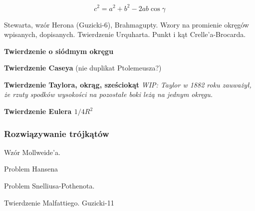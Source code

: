 $$c^2 = a^2 + b^2 - 2ab \cos \gamma$$


Stewarta, wzór Herona (Guzicki-6), Brahmagupty.
Wzory na promienie okręgów wpisanych, dopisanych.
Twierdzenie Urquharta.
Punkt i kąt Crelle'a-Brocarda.

\textbf{Twierdzenie o siódmym okręgu}

\textbf{Twierdzenie Caseya} (nie duplikat Ptolemeusza?)

\textbf{Twierdzenie Taylora, okrąg, sześciokąt}
{
    \emph{WIP: Taylor w 1882 roku zauważył, że rzuty spodków wysokości na pozostałe boki leżą na jednym okręgu.}
}

\textbf{Twierdzenie Eulera $1/4R^2$}


\subsubsection{Rozwiązywanie trójkątów}
Wzór Mollweide'a.
%

Problem Hansena
%

Problem Snelliusa-Pothenota.
%



Twierdzenie Malfattiego.
Guzicki-11

%